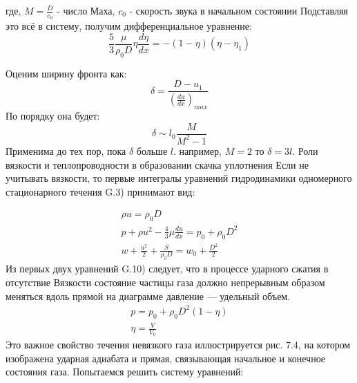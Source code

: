 \documentclass[10pt, a4paper]{article}
\numberwithin{equation}{section}
\begin{document}
где, $M=\frac{D}{c_0}$ - число Маха, $c_0$ - скорость звука в начальном состоянии 
Подставляя это всё в систему, получим дифференциальное уравнение:
\begin{equation}
	\frac{5}{3} \frac{\mu}{\rho_0 D} \eta \frac{d\eta}{dx}=-(1-\eta)(\eta - \eta_1)
\end{equation}
\begin{figure}[h!]
\end{figure}
Оценим ширину фронта как:
\begin{equation}
	\delta = \frac{D-u_1}{(\frac{du}{dx})_{max}}
\end{equation}
По порядку она будет:
\begin{equation}
	\delta \sim l_0 \frac{M}{M^{2}-1}
\end{equation}
Применима до тех пор, пока $\delta$ больше $l$. например, $M=2$ то $\delta=3 l$.
Роли вязкости и теплопроводности в образовании скачка уплотнения 
Если не учитывать вязкости, то первые интегралы уравнений гидродинамики одномерного стационарного течения G.3) принимают вид: 

\begin{eqnarray}
	\rho u = \rho_0 D \\ p+\rho u^{2} - \frac{4}{3} \mu \frac{du}{dx} = p_0 + \rho_0 D^{2} \\ w + \frac{u^{2}}{2} + \frac{S}{\rho_0 D}  = w_0 + \frac{D^{2}}{2}
\end{eqnarray}
Из первых двух уравнений G.10) следует, что в процессе ударного сжатия в отсутствие Вязкости состояние частицы газа должно непрерывным образом меняться вдоль прямой на диаграмме давление — удельный объем. 
\begin{eqnarray}
	p=p_0 + \rho_0 D^{2} (1-\eta) \\ \eta=\frac{V}{V_0}
\end{eqnarray}
Это важное свойство течения невязкого газа иллюстрируется рис. 7.4, на котором изображена ударная адиабата и прямая, связывающая начальное и конечное состояния газа. Попытаемся решить систему уравнений: 
\end{document}
